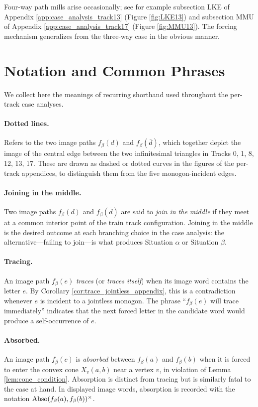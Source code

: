 Four-way path mills arise occasionally; see for example subsection LKE of Appendix \ref{app:case_analysis_track13} (Figure \ref{fig:LKE13}) and subsection MMU of Appendix \ref{app:case_analysis_track17} (Figure \ref{fig:MMU13}). The forcing mechanism generalizes from the three-way case in the obvious manner.

\section{Notation and Common Phrases}
\label{sec:case_analysis_notation}

We collect here the meanings of recurring shorthand used throughout the per-track case analyses.

\paragraph{Dotted lines.}
Refers to the two image paths $f_\beta(d)$ and $f_\beta(\bar{d})$, which together depict the image of the central edge between the two infinitesimal triangles in Tracks 0, 1, 8, 12, 13, 17. These are drawn as dashed or dotted curves in the figures of the per-track appendices, to distinguish them from the five monogon-incident edges.

\paragraph{Joining in the middle.}
Two image paths $f_\beta(d)$ and $f_\beta(\bar{d})$ are said to \emph{join in the middle} if they meet at a common interior point of the train track configuration. Joining in the middle is the desired outcome at each branching choice in the case analysis: the alternative---failing to join---is what produces Situation $\alpha$ or Situation $\beta$.

\paragraph{Tracing.}
An image path $f_\beta(e)$ \emph{traces} (or \emph{traces itself}) when its image word contains the letter $e$. By Corollary \ref{cor:trace_jointless_appendix}, this is a contradiction whenever $e$ is incident to a jointless monogon. The phrase ``$f_\beta(e)$ will trace immediately'' indicates that the next forced letter in the candidate word would produce a self-occurrence of $e$.

\paragraph{Absorbed.}
An image path $f_\beta(c)$ is \emph{absorbed} between $f_\beta(a)$ and $f_\beta(b)$ when it is forced to enter the convex cone $X_v(a, b)$ near a vertex $v$, in violation of Lemma \ref{lem:cone_condition}. Absorption is distinct from tracing but is similarly fatal to the case at hand. In displayed image words, absorption is recorded with the notation $\operatorname{Abso}(f_\beta(a), f_\beta(b))^\times$.

